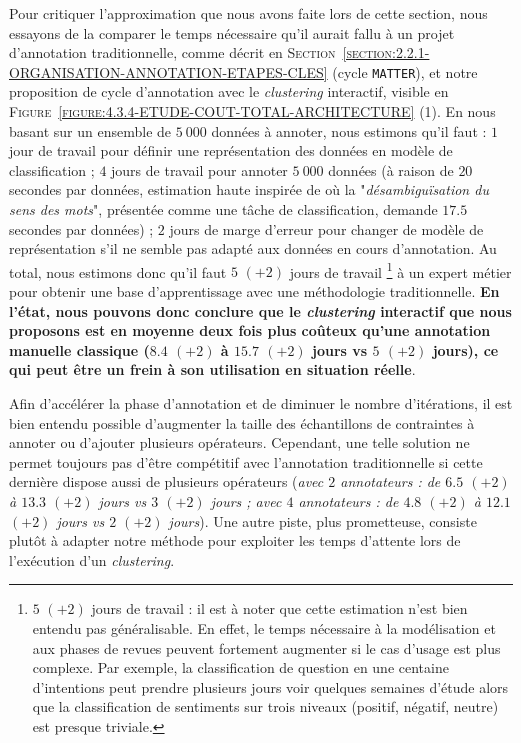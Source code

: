 			Pour critiquer l'approximation que nous avons faite lors de cette section, nous essayons de la comparer le temps nécessaire qu'il aurait fallu à un projet d'annotation traditionnelle, comme décrit en \textsc{Section~\ref{section:2.2.1-ORGANISATION-ANNOTATION-ETAPES-CLES}} (cycle \texttt{MATTER}), et notre proposition de cycle d'annotation avec le \textit{clustering} interactif, visible en \textsc{Figure~\ref{figure:4.3.4-ETUDE-COUT-TOTAL-ARCHITECTURE}} (1).
			En nous basant sur un ensemble de $5~000$ données à annoter, nous estimons qu'il faut :
			$1$ jour de travail pour définir une représentation des données en modèle de classification ;
			$4$ jours de travail pour annoter $5~000$ données (à raison de $20$ secondes par données, estimation haute inspirée de \cite{pradhan-etal:2007:semeval2007-task-17} où la "\textit{désambiguïsation du sens des mots}", présentée comme une tâche de classification, demande $17.5$ secondes par données) ;
			$2$ jours de marge d'erreur pour changer de modèle de représentation s'il ne semble pas adapté aux données en cours d'annotation.
			Au total, nous estimons donc qu'il faut $5$ {\footnotesize $(+2)$} jours de travail \footnote{
				$5$ {\footnotesize $(+2)$} jours de travail : il est à noter que cette estimation n'est bien entendu pas généralisable.
				En effet, le temps nécessaire à la modélisation et aux phases de revues peuvent fortement augmenter si le cas d'usage est plus complexe.
				Par exemple, la classification de question en une centaine d'intentions peut prendre plusieurs jours voir quelques semaines d'étude alors que la classification de sentiments sur trois niveaux (positif, négatif, neutre) est presque triviale.
			} à un expert métier pour obtenir une base d'apprentissage avec une méthodologie traditionnelle.
			\textbf{En l'état, nous pouvons donc conclure que le \textit{clustering} interactif que nous proposons est en moyenne deux fois plus coûteux qu'une annotation manuelle classique ($8.4$ {\footnotesize $(+2)$} à $15.7$ {\footnotesize $(+2)$} jours vs $5$ {\footnotesize $(+2)$} jours), ce qui peut être un frein à son utilisation en situation réelle}.
			
			Afin d'accélérer la phase d'annotation et de diminuer le nombre d'itérations, il est bien entendu possible d'augmenter la taille des échantillons de contraintes à annoter ou d'ajouter plusieurs opérateurs.
			Cependant, une telle solution ne permet toujours pas d'être compétitif avec l'annotation traditionnelle si cette dernière dispose aussi de plusieurs opérateurs (\textit{avec $2$ annotateurs : de $6.5$ {\footnotesize $(+2)$} à $13.3$ {\footnotesize $(+2)$} jours vs $3$ {\footnotesize $(+2)$} jours ; avec $4$ annotateurs : de $4.8$ {\footnotesize $(+2)$} à $12.1$ {\footnotesize $(+2)$} jours vs $2$ {\footnotesize $(+2)$} jours}).
			Une autre piste, plus prometteuse, consiste plutôt à adapter notre méthode pour exploiter les temps d'attente lors de l'exécution d'un \textit{clustering}.
			

